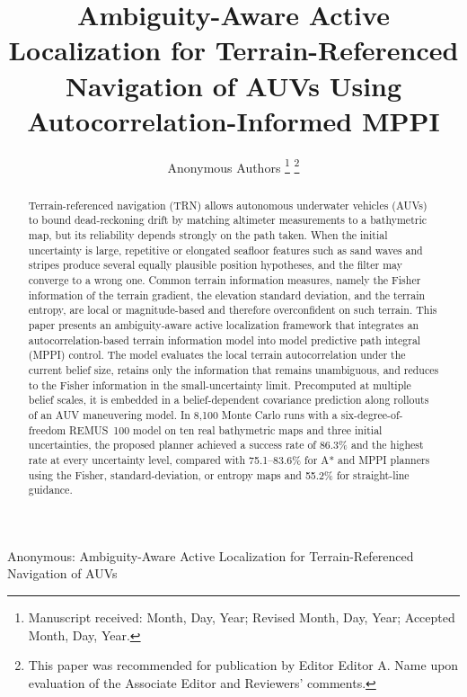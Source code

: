 \documentclass[letterpaper, 10 pt, journal, twoside]{IEEEtran}
\begin{document}
\title{Ambiguity-Aware Active Localization for Terrain-Referenced Navigation of AUVs Using Autocorrelation-Informed MPPI}

\author{Anonymous Authors%
\thanks{Manuscript received: Month, Day, Year; Revised Month, Day, Year; Accepted Month, Day, Year.}%
\thanks{This paper was recommended for publication by Editor Editor A. Name upon evaluation of the Associate Editor and Reviewers' comments.}%
}

%
{Anonymous: Ambiguity-Aware Active Localization for Terrain-Referenced Navigation of AUVs}

\maketitle

\begin{abstract}
Terrain-referenced navigation (TRN) allows autonomous underwater vehicles (AUVs) to bound dead-reckoning drift by matching altimeter measurements to a bathymetric map, but its reliability depends strongly on the path taken. When the initial uncertainty is large, repetitive or elongated seafloor features such as sand waves and stripes produce several equally plausible position hypotheses, and the filter may converge to a wrong one. Common terrain information measures, namely the Fisher information of the terrain gradient, the elevation standard deviation, and the terrain entropy, are local or magnitude-based and therefore overconfident on such terrain. This paper presents an ambiguity-aware active localization framework that integrates an autocorrelation-based terrain information model into model predictive path integral (MPPI) control. The model evaluates the local terrain autocorrelation under the current belief size, retains only the information that remains unambiguous, and reduces to the Fisher information in the small-uncertainty limit. Precomputed at multiple belief scales, it is embedded in a belief-dependent covariance prediction along rollouts of an AUV maneuvering model. In 8,100 Monte Carlo runs with a six-degree-of-freedom REMUS~100 model on ten real bathymetric maps and three initial uncertainties, the proposed planner achieved a success rate of 86.3\% and the highest rate at every uncertainty level, compared with 75.1--83.6\% for A* and MPPI planners using the Fisher, standard-deviation, or entropy maps and 55.2\% for straight-line guidance.
\end{abstract}
\end{document}
